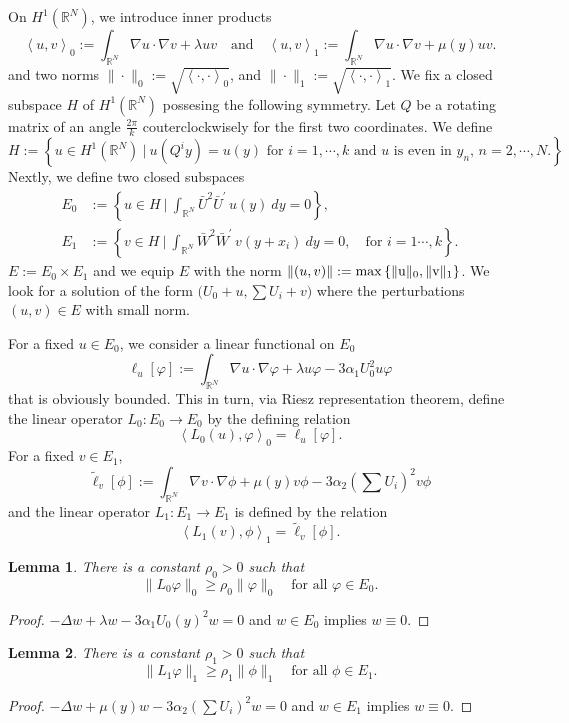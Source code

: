 \documentclass[a4paper,11pt]{article}
\def\blue{\color{blue}}
\def\blue{\color{blue}}
\newtheorem{lemma}{Lemma}[section]
\numberwithin{step}{dummy}
\begin{document}
On $H^1( \mathbb{R}^N)$, we introduce inner products
$$ \left<u,v\right>_0:= \int_{ \mathbb{R}^N} \nabla u\cdot\nabla v + \lambda uv \quad \text{and} \quad \left<u,v\right>_1:= \int_{ \mathbb{R}^N} \nabla u\cdot\nabla v + \mu(y) uv.$$ and two norms $\|\cdot\|_0:=\sqrt{\left<\cdot,\cdot\right>_0}$, and $\|\cdot\|_1:=\sqrt{\left<\cdot,\cdot\right>_1}$. We fix a closed subspace $H$ of $H^1( \mathbb{R}^N)$ possesing the following symmetry. Let $Q$ be a rotating matrix of an angle $\frac{2\pi}{k}$ couterclockwisely for the first two coordinates. We define 
\begin{equation*}
 H:= \left\{ u \in H^1 (\mathbb{R}^N) ~\Big|~ \text{$u(Q^iy) = u(y)$ for $i=1,\cdots,k$ and $u$ is even in $y_n$, $n=2,\cdots,N$.}\right\}
\end{equation*}
Nextly, we define two closed subspaces 
\begin{equation}
 \begin{aligned}
 E_0&:= \left\{ u \in H ~\Big|~ \int_{\mathbb{R}^N}   \bar{U}^2 \bar{U}^\prime \,u(y)~dy = 0 \right\}, \\
 E_1&:= \left\{ v \in H ~\Big|~ \int_{\mathbb{R}^N}   \bar{W}^2 \bar{W}^\prime \,v(y+x_i)~dy = 0, \quad \text{for $i=1\cdots,k$} \right\}.
 \end{aligned}
\end{equation}
$E:= E_0 \times E_1$ and we equip $E$ with the norm $\|(u,v)\|:= \rm{max} \left\{ \|u\|_0, \|v\|_1\right\}$. We look for a solution of the form $\big(U_0 +u, \sum U_i + v\big)$ where the perturbations $(u,v)\in E$ with small norm. 



For a fixed $u \in E_0$, we consider a linear functional on $E_0$
$$\ell_u[\varphi] := \int_{ \mathbb{R}^N} \nabla u\cdot\nabla\varphi + \lambda u \varphi - 3\alpha_1 U_0^2 u\varphi$$
that is obviously bounded. This in turn, via Riesz representation theorem, define the linear operator $L_0: E_0 \rightarrow E_0$ by the defining relation
$$\left<L_0(u),\varphi\right>_0 = \ell_u[\varphi].$$
For a fixed $v \in E_1$,
$$\tilde\ell_v[\phi]:=\int_{ \mathbb{R}^N} \nabla v\cdot\nabla\phi + \mu(y) v \phi - 3\alpha_2 \left(\sum U_i\right)^2 v\phi$$
and the linear operator $L_1: E_1 \rightarrow E_1$ is defined by the relation
$$\left<L_1(v),\phi\right>_1 = \tilde\ell_v[\phi].$$




\begin{lemma} There is a constant $\rho_0>0$ such that
$$ \|L_0 \varphi\|_0 \ge \rho_0 \|\varphi\|_0 \quad \text{for all $\varphi \in E_0$}.$$
\end{lemma}
\begin{proof}
\blue
 $-\Delta w + \lambda w - 3\alpha_1U_0(y)^2 w = 0$ and $w \in E_0$ implies $w\equiv0$. 
\end{proof}
\begin{lemma} There is a constant $\rho_1>0$ such that
$$ \|L_1 \varphi\|_1 \ge \rho_1 \|\phi\|_1 \quad \text{for all $\phi \in E_1$}.$$
\end{lemma}
\begin{proof}
\blue
 $-\Delta w + \mu(y) w - 3\alpha_2\left(\sum U_i\right)^2 w = 0$ and $w \in E_1$ implies $w\equiv0$. 
\end{proof}
\end{document}
